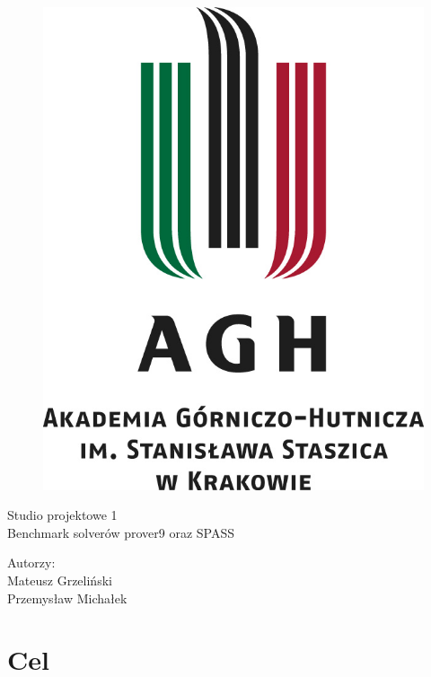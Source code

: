 \documentclass[a4paper,12pt]{article}
\begin{document}
\onehalfspacing

\begin{figure}[!htb]
    \centerline{\includegraphics[scale=0.8]{images/agh_logo.jpg}}
\end{figure}

\begin{center}
    \Huge{Studio projektowe 1\\}
    \Large{Benchmark solverów prover9 oraz SPASS\\}


    \vspace{5cm}
    \Large{	Autorzy:\\
	Mateusz Grzeliński\\
    Przemysław Michałek\\}

    \newpage


\end{center}

\section{Cel}
\end{document}
